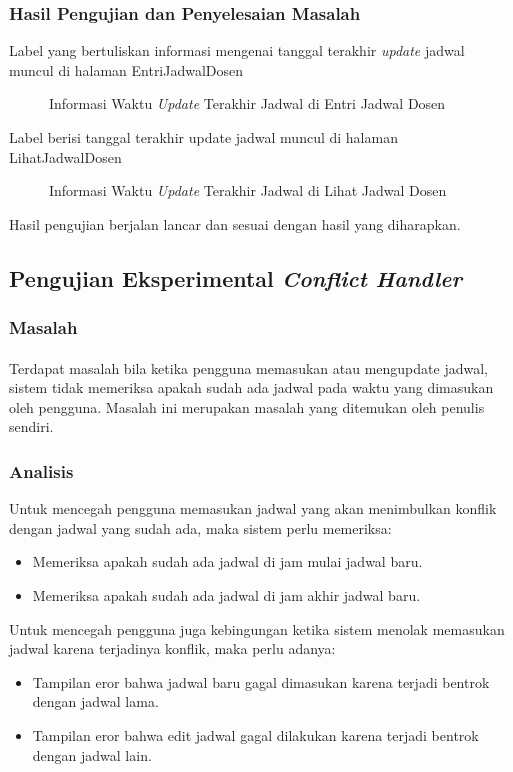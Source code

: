 \subsubsection{Hasil Pengujian dan Penyelesaian Masalah}
Label yang bertuliskan informasi mengenai tanggal terakhir \textit{update} jadwal muncul di halaman EntriJadwalDosen
\begin{figure} [H]
	\centering  
	\caption[Informasi Waktu \textit{Update} Terakhir Jadwal di Entri Jadwal Dosen]{Informasi Waktu \textit{Update} Terakhir Jadwal di Entri Jadwal Dosen}
\end{figure}
Label berisi tanggal terakhir update jadwal muncul di halaman LihatJadwalDosen
\begin{figure} [H]
	\centering  
	\caption[Informasi Waktu \textit{Update} Terakhir Jadwal di Lihat Jadwal Dosen]{Informasi Waktu \textit{Update} Terakhir Jadwal di Lihat Jadwal Dosen}
\end{figure}
Hasil pengujian berjalan lancar dan sesuai dengan hasil yang diharapkan.

\subsection{Pengujian Eksperimental \textit{Conflict Handler}}
\subsubsection{Masalah}
\paragraph{}Terdapat masalah bila ketika pengguna memasukan atau mengupdate jadwal, sistem tidak memeriksa apakah sudah ada jadwal pada waktu yang dimasukan oleh pengguna. Masalah ini merupakan masalah yang ditemukan oleh penulis sendiri.
\subsubsection{Analisis}
Untuk mencegah pengguna memasukan jadwal yang akan menimbulkan konflik dengan jadwal yang sudah ada, maka sistem perlu memeriksa:
\begin{itemize}
	\item Memeriksa apakah sudah ada jadwal di jam mulai jadwal baru.
	\item Memeriksa apakah sudah ada jadwal di jam akhir jadwal baru.
\end{itemize}
Untuk mencegah pengguna juga kebingungan ketika sistem menolak memasukan jadwal karena terjadinya konflik, maka perlu adanya:
\begin{itemize}
	\item Tampilan eror bahwa jadwal baru gagal dimasukan karena terjadi bentrok dengan jadwal lama.
	\item Tampilan eror bahwa edit jadwal gagal dilakukan karena terjadi bentrok dengan jadwal lain.
\end{itemize}
